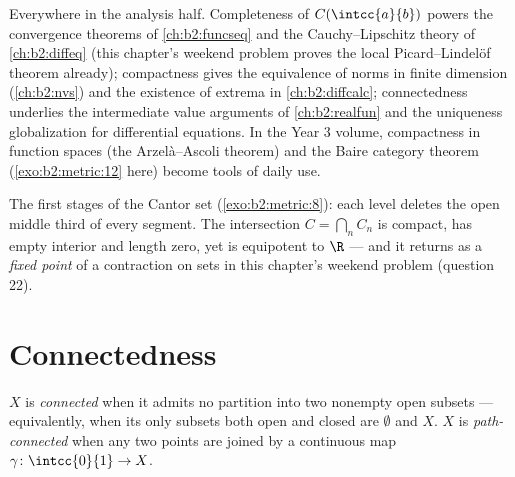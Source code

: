 \begin{remark}
Everywhere in the analysis half. Completeness of
$C(\intcc{a}{b})$ powers the convergence theorems of
\cref{ch:b2:funcseq} and the Cauchy--Lipschitz theory of
\cref{ch:b2:diffeq} (this chapter's weekend problem proves the
local Picard--Lindel\"of theorem already); compactness gives the
equivalence of norms in finite dimension (\cref{ch:b2:nvs}) and
the existence of extrema in \cref{ch:b2:diffcalc}; connectedness
underlies the intermediate value arguments of \cref{ch:b2:realfun}
and the uniqueness globalization for differential equations. In
the Year 3 volume, compactness in function spaces (the
Arzel\`a--Ascoli theorem) and the Baire category theorem
(\cref{exo:b2:metric:12} here) become tools of daily use.
\end{remark}

\begin{omfigure}

{\small The first stages of the Cantor set
(\cref{exo:b2:metric:8}): each level deletes the open middle
third of every segment. The intersection $C = \bigcap_n C_n$ is
compact, has empty interior and length zero, yet is equipotent
to $\R$ --- and it returns as a \emph{fixed point} of a
contraction on sets in this chapter's weekend problem (question
22).}
\end{omfigure}

\section{Connectedness}

\begin{definition}\label{def:b2:metric:connected}
$X$ is \emph{connected} when it admits no
partition into two nonempty open subsets --- equivalently, when its
only subsets both open and closed are $\emptyset$ and $X$. $X$ is
\emph{path-connected} when any two points are joined by a continuous
map $\gamma \colon \intcc{0}{1} \to X$.
\end{definition}

